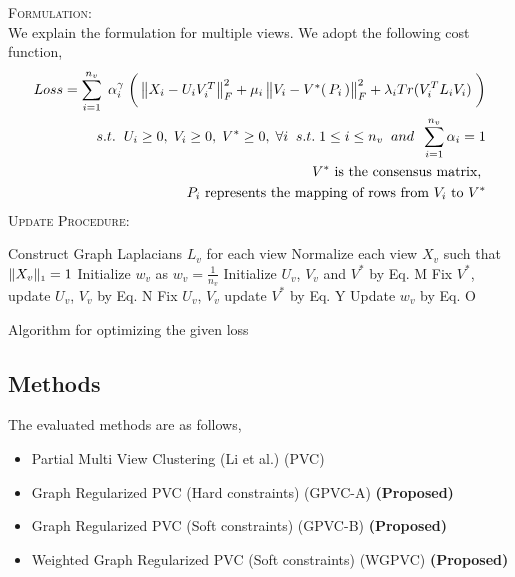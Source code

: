 \documentclass[a4paper]{article}
\begin{document}
	\textsc{Formulation:}\\
	We explain the formulation for multiple views. We adopt the following cost function,
	\begin{align*}
	Loss = \displaystyle\sum_{i=1}^{n_{v}} \; \alpha_{i}^{\gamma} \; 
		\bigg(\begin{Vmatrix} X_{i}-U_{i}V^{T}_{i} \end{Vmatrix}^{2}_{F}	
		+ \mu_{i}\begin{Vmatrix} V_{i}-V^{*}(\, P_{i} \, ) \end{Vmatrix}^{2}_{F}
		+ \lambda_{i}Tr(V^{T}_{i}L_{i}V_{i}) \; \bigg)\\	
		s.t. \hspace{2mm}  U_{i}\geq0,\;V_{i}\geq0,\;V^{*}\geq0,\;\forall i \;\;s.t.\; 1 \leq i \leq n_{v}
		\;\; and \;\; \sum_{i=1}^{n_{v}} \alpha_{i} = 1 \\
		V^{*} \text{ is the consensus matrix, } \\
		P_{i} \text{ represents the mapping of rows from } V_{i} \text{ to } V^{*}
	\end{align*}
	\textsc{Update Procedure:}

	\begin{algorithm}
		Construct Graph Laplacians $L_{v}$ for each view\;
		Normalize each view $X_{v}$ such that $\|X_{v}\|_{\text{\tiny1}} = 1 $\;
		Initialize $w_{v}$ as $w_{v}=${\tiny{${\frac{1}{n_{v}}}$}}\;
		Initialize  $U_{v}$, $V_{v}$ and $V^{*}$ by Eq. M\;
		{
			{
				{
					Fix $V^{*}$, update $U_{v}$, $V_{v}$ by Eq. N\;
				}
			}
			Fix $U_{v}$, $V_{v}$ update $V^{*}$ by Eq. Y\;		
			Update $w_{v}$ by Eq. O\;
		}						
		\caption{Algorithm for optimizing the given loss}
	\end{algorithm}

	\subsection{Methods}
	
	The evaluated methods are as follows,
	\begin{itemize}
	\item {Partial Multi View Clustering (Li et al.) (PVC)}
	\item {Graph Regularized PVC (Hard constraints) (GPVC-A)	\small\textbf{(Proposed)}}
	\item {Graph Regularized PVC (Soft constraints) (GPVC-B)	\small\textbf{(Proposed)}}
	\item {Weighted Graph Regularized PVC (Soft constraints) (WGPVC)	\small\textbf{(Proposed)}}
	\end{itemize}
\end{document}
